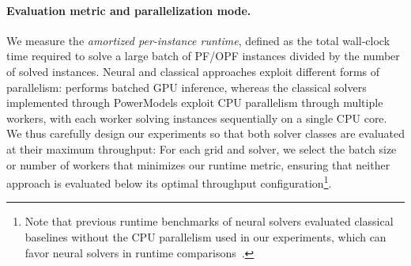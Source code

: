 \paragraph{Evaluation metric and parallelization mode.}
We measure the \emph{amortized per-instance runtime}, defined as the total wall-clock time required to solve a large batch of PF/OPF instances divided by the number of solved instances. 
Neural and classical approaches exploit different forms of parallelism: \genco performs batched GPU inference, whereas the classical solvers implemented through PowerModels exploit CPU parallelism through multiple workers, with each worker solving instances sequentially on a single CPU core.
We thus carefully design our experiments so that both solver classes are evaluated at their maximum throughput: For each grid and solver, we select the batch size or number of workers that minimizes our runtime metric, ensuring that neither approach is evaluated below its optimal throughput configuration\footnote{Note that previous runtime benchmarks of neural solvers evaluated classical baselines without the CPU parallelism used in our experiments, which can favor neural solvers in runtime comparisons~\cite{NEURIPS2025_d000ef56, arowolo2025, piloto2024}.}.



